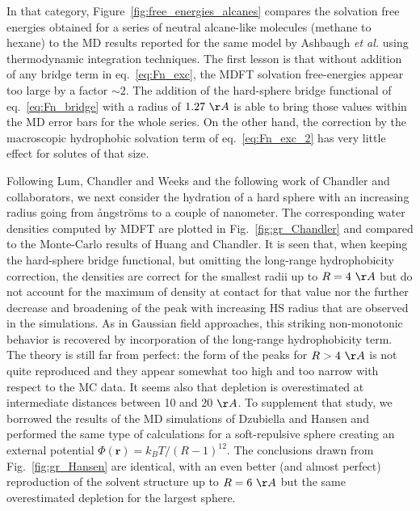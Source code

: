 \documentclass[aip,jcp,preprint]{revtex4-1}
\newcommand{\rr}{\mathbf{r}}
\newcommand{\angstrom}{\r{a}ngstr\"{o}m}
\begin{document}
In that category, Figure~\ref{fig:free_energies_alcanes} compares the solvation free energies obtained for a series of  neutral alcane-like  molecules (methane to hexane) to the MD results reported for the same model by  Ashbaugh {\em et al.} using thermodynamic integration techniques\cite{ashbaugh_hydration_1998}. The first lesson is that without addition of any bridge term in eq.~\ref{eq:Fn_exc}, the MDFT solvation free-energies appear too large by a factor $\sim 2$. The addition of the hard-sphere bridge functional of eq.~\ref{eq:Fn_bridge} with a radius of $1.27~\AA$ is able to bring those values within the MD  error bars for the whole series. On the other hand, the correction by the macroscopic hydrophobic solvation term of eq.~\ref{eq:Fn_exc_2} has very little effect for solutes of that size.

Following Lum, Chandler and Weeks\cite{lum99} and the following work of Chandler and collabora\-tors\cite{tenwolde01,huang02,varilly11},  we next consider the hydration of a hard sphere with an increasing radius going from  \angstrom s to   a couple of nanometer.  The corresponding water densities computed by MDFT are plotted in Fig.~\ref{fig:gr_Chandler} and compared to the Monte-Carlo results of Huang and Chandler\cite{huang02}. It is seen that, when keeping the hard-sphere bridge functional, but omitting the long-range hydrophobicity correction, the densities are correct for the smallest radii up to $R=4~\AA$ but do not account for the maximum of density at contact for that value nor the further  decrease and broadening of the peak with increasing HS  radius that are   observed  in the simulations. As in Gaussian field approaches, this striking  non-monotonic behavior is recovered by incorporation of the long-range hydrophobicity term. The theory is still far from perfect:  the form of the peaks for $R>4~\AA$ is not quite reproduced and they appear somewhat too high and too narrow with respect to the MC data. It seems also that depletion is overestimated at intermediate distances between 10 and 20 $\AA$. To supplement that study, we borrowed the results of the MD simulations of Dzubiella and Hansen\cite{dzubiella04} and performed the same type of calculations  for a soft-repulsive sphere creating an external potential   $\Phi(\rr) = k_BT/(R -1)^{12}$. 
The conclusions drawn from Fig.~\ref{fig:gr_Hansen} are identical, with  an even better (and almost perfect) reproduction of the solvent structure up to $R=6~\AA$ but the same overestimated depletion for the largest sphere. 
\end{document}
